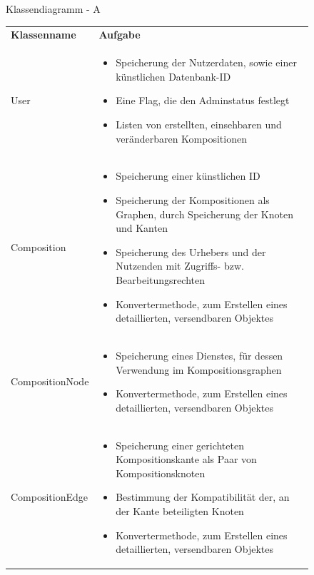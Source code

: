 \begin{figure}[h]
	\centering
	\caption{Klassendiagramm - A}
	\label{fig:klassendiagramm-a}
\end{figure}

\begin{figure}[h]
	\centering
	\begin{tabularx}{\textwidth}{p{} | X}
		\rowcolor[HTML]{C0C0C0}
		\textbf{Klassenname} & \textbf{Aufgabe} \\
		User & \begin{itemize}
			\item Speicherung der Nutzerdaten, sowie einer künstlichen Datenbank-ID
			\item Eine Flag, die den Adminstatus festlegt
			\item Listen von erstellten, einsehbaren und veränderbaren Kompositionen
		\end{itemize}\\
		\rowcolor[HTML]{E7E7E7}
		Composition & \begin{itemize}
		  \item Speicherung einer künstlichen ID
			\item Speicherung der Kompositionen als Graphen, durch Speicherung der Knoten und Kanten
			\item Speicherung des Urhebers und der Nutzenden mit Zugriffs- bzw. Bearbeitungsrechten
			\item Konvertermethode, zum Erstellen eines detaillierten, versendbaren Objektes
		\end{itemize} \\
		CompositionNode & \begin{itemize}
			\item Speicherung eines Dienstes, für dessen Verwendung im Kompositionsgraphen
			\item Konvertermethode, zum Erstellen eines detaillierten, versendbaren Objektes
		\end{itemize} \\
		\rowcolor[HTML]{E7E7E7}
		CompositionEdge & \begin{itemize}
			\item Speicherung einer gerichteten Kompositionskante als Paar von Kompositionsknoten
			\item Bestimmung der Kompatibilität der, an der Kante beteiligten Knoten
			\item Konvertermethode, zum Erstellen eines detaillierten, versendbaren Objektes
		\end{itemize} \\

\end{tabularx}
\end{figure}
